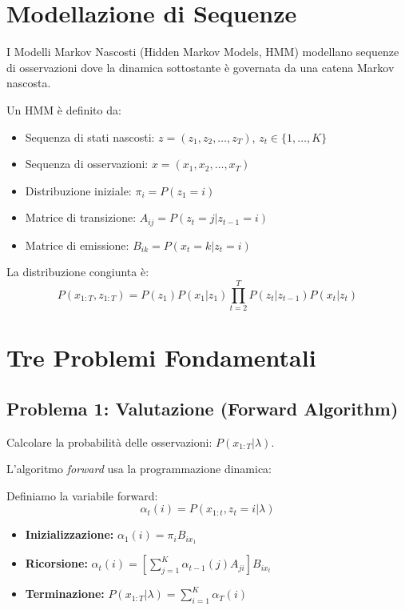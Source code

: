 \section{Modellazione di Sequenze}

I Modelli Markov Nascosti (Hidden Markov Models, HMM) modellano sequenze di osservazioni dove la dinamica sottostante è governata da una catena Markov nascosta.

\begin{definition}
  Un HMM è definito da:
  \begin{itemize}
    \item Sequenza di stati nascosti: $z = (z_1, z_2, \ldots, z_T)$, $z_t \in \{1,\ldots,K\}$
    \item Sequenza di osservazioni: $x = (x_1, x_2, \ldots, x_T)$
    \item Distribuzione iniziale: $\pi_i = P(z_1 = i)$
    \item Matrice di transizione: $A_{ij} = P(z_t = j | z_{t-1} = i)$
    \item Matrice di emissione: $B_{ik} = P(x_t = k | z_t = i)$
  \end{itemize}
\end{definition}

La distribuzione congiunta è:
\[P(x_{1:T}, z_{1:T}) = P(z_1) P(x_1|z_1) \prod_{t=2}^T P(z_t|z_{t-1}) P(x_t|z_t)\]

\section{Tre Problemi Fondamentali}

\subsection{Problema 1: Valutazione (Forward Algorithm)}

Calcolare la probabilità delle osservazioni: $P(x_{1:T}|\lambda)$.

L'algoritmo \textit{forward} usa la programmazione dinamica:

\begin{definition}
  Definiamo la variabile forward:
  \[\alpha_t(i) = P(x_{1:t}, z_t = i | \lambda)\]
\end{definition}

\begin{theorem}
  \begin{itemize}
    \item \textbf{Inizializzazione:} $\alpha_1(i) = \pi_i B_{ix_1}$
    \item \textbf{Ricorsione:} $\alpha_t(i) = \left[\sum_{j=1}^K \alpha_{t-1}(j) A_{ji}\right] B_{ix_t}$
    \item \textbf{Terminazione:} $P(x_{1:T}|\lambda) = \sum_{i=1}^K \alpha_T(i)$
  \end{itemize}
\end{theorem}


